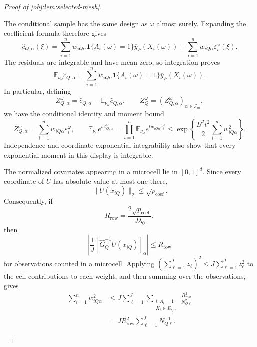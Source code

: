 \documentclass[11pt]{article}
\begin{document}
\begin{proof}[Proof of \cref{obj:lem:selected-mesh}]
\begin{enumerate}
The conditional sample has the same design as \(\omega\) almost surely.
Expanding the coefficient formula therefore gives
\[
\widehat c_{Q,\alpha}(\xi)
=
\sum_{i=1}^n w_{iQ\alpha}
\mathbf1\{A_i(\omega)=1\}\overline y_P(X_i(\omega))
+
\sum_{i=1}^n w_{iQ\alpha}\varepsilon_i^\omega(\xi).
\]
The residuals are integrable and have mean zero, so integration proves
\[
\mathbb E_{\nu_\omega}\widehat c_{Q,\alpha}
=
\sum_{i=1}^n w_{iQ\alpha}
\mathbf1\{A_i(\omega)=1\}\overline y_P(X_i(\omega)).
\]
In particular, defining
\[
Z_{Q,\alpha}^\omega
=
\widehat c_{Q,\alpha}
-\mathbb E_{\nu_\omega}\widehat c_{Q,\alpha},
\qquad
Z_Q^\omega=(Z_{Q,\alpha}^\omega)_{\alpha\in\mathcal I_m},
\]
we have the conditional identity and moment bound
\[
Z_{Q,\alpha}^\omega
=
\sum_{i=1}^n w_{iQ\alpha}\varepsilon_i^\omega,
\qquad
\mathbb E_{\nu_\omega}e^{tZ_{Q,\alpha}^\omega}
=
\prod_{i=1}^n
\mathbb E_{\nu_\omega}e^{tw_{iQ\alpha}\varepsilon_i^\omega}
\le
\exp\!\left\{
\frac{B^2t^2}{2}\sum_{i=1}^n w_{iQ\alpha}^2
\right\}.
\]
Independence and coordinate exponential integrability also show that
every exponential moment in this display is integrable.

The normalized covariates appearing in a microcell lie in
\([0,1]^d\). Since every coordinate of \(U\) has absolute value at most
one there,
\[
\|U(x_{iQ})\|_2\le\sqrt{p_{\mathrm{coef}}}.
\]
Consequently, if
\[
R_{\mathrm{row}}
=
\frac{2\sqrt{p_{\mathrm{coef}}}}{J\lambda_0},
\]
then
\[
\left|
\frac1J[\widehat G_Q^{-1}U(x_{iQ})]_\alpha
\right|\le R_{\mathrm{row}}
\]
for observations counted in a microcell. Applying
\((\sum_{\ell=1}^{J}z_\ell)^2\le J\sum_{\ell=1}^{J}z_\ell^2\)
to the cell contributions to each weight, and then summing over the
observations, gives
\[
\begin{aligned}
\sum_{i=1}^n w_{iQ\alpha}^2
&\le
J\sum_{\ell=1}^{J}
\sum_{\substack{i:A_i=1\\X_i\in E_{Q\ell}}}
\frac{R_{\mathrm{row}}^2}{N_{Q\ell}^2}\\
&=
JR_{\mathrm{row}}^2\sum_{\ell=1}^{J}N_{Q\ell}^{-1}.
\end{aligned}
\]


\end{enumerate}
\end{proof}
\end{document}
